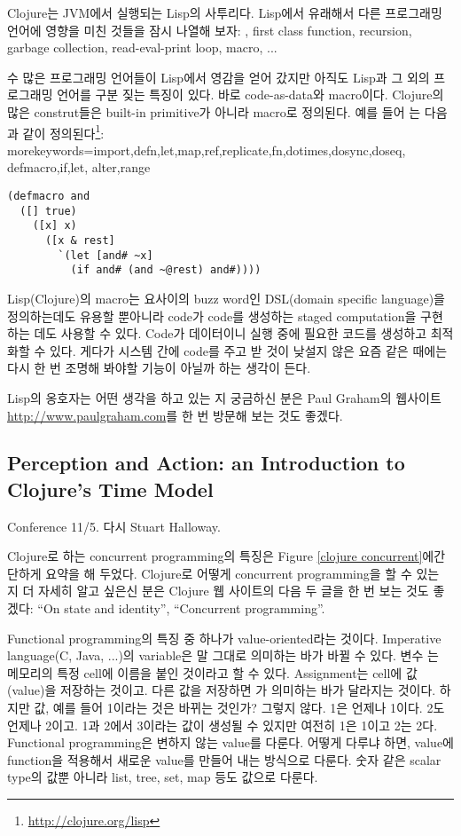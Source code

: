 \documentclass[11pt]{article}
\begin{document}
Clojure는 JVM에서 실행되는 Lisp의 사투리다. Lisp에서 유래해서 다른 
프로그래밍 언어에 영향을 미친 것들을 잠시 나열해 보자: ,
first class function, recursion, garbage collection, read-eval-print loop, 
macro, ...

수 많은 프로그래밍 언어들이 Lisp에서 영감을 얻어 갔지만 아직도 Lisp과 그 외의
프로그래밍 언어를 구분 짖는 특징이 있다. 바로 code-as-data와 macro이다.
Clojure의 많은 construt들은 built-in primitive가 아니라 macro로 정의된다.
예를 들어 는 다음과 같이 
정의된다\footnote{\url{http://clojure.org/lisp}}:
    {morekeywords={import,defn,let,map,ref,replicate,fn,dotimes,dosync,doseq,
                   defmacro,if,let, alter,range}
    }
\begin{lstlisting}
(defmacro and
  ([] true)
    ([x] x)
      ([x & rest]
        `(let [and# ~x]
          (if and# (and ~@rest) and#))))
\end{lstlisting}
Lisp(Clojure)의 macro는 요사이의 buzz word인 DSL(domain specific language)을 
정의하는데도 유용할 뿐아니라 code가 code를 생성하는 staged computation을 
구현하는 데도 사용할 수 있다. Code가 데이터이니 실행 중에 필요한 코드를 
생성하고 최적화할 수 있다. 게다가 시스템 간에 code를 주고 받 것이 낮설지 않은 
요즘 같은 때에는 다시 한 번 조명해 봐야할 기능이 아닐까 하는 생각이 든다.

Lisp의 옹호자는 어떤 생각을 하고 있는 지 궁금하신 분은 Paul Graham의
웹사이트 \url{http://www.paulgraham.com}를 한 번 방문해 보는 것도 좋겠다.

\subsection{Perception and Action: an Introduction to Clojure's Time Model}

Conference 11/5. 다시 Stuart Halloway.

Clojure로 하는 concurrent programming의 특징은 
Figure \ref{clojure concurrent}에간 단하게 요약을 해 두었다.
Clojure로 어떻게 concurrent programming을 할 수 있는 지 더 자세히 알고 싶은신
분은 Clojure 웹 사이트의 다음 두 글을 한 번 보는 것도 좋겠다:  ``On state and
identity'', ``Concurrent programming''.
 
Functional programming의 특징 중 하나가 value-oriented라는
것이다. Imperative language(C, Java, ...)의 variable은 말 그대로 의미하는 바가
바뀔 수 있다. 변수 는 메모리의 특정 cell에 이름을 붙인 것이라고 할 수 
있다. Assignment는 cell에 값(value)을 저장하는 것이고. 다른 값을 저장하면 
가 의미하는 바가 달라지는 것이다. 하지만 값, 예를 들어 1이라는 것은 
바뀌는 것인가? 그렇지 않다. 1은 언제나 1이다. 2도 언제나 2이고. 1과 2에서 
3이라는 값이 생성될 수 있지만 여전히 1은 1이고 2는 2다.
Functional programming은 변하지 않는 value를 다룬다. 어떻게 다루냐 하면, 
value에 function을 적용해서 새로운 value를 만들어 내는 방식으로 다룬다.
숫자 같은 scalar type의 값뿐 아니라 list, tree, set, map 등도 값으로 다룬다.
\end{document}
